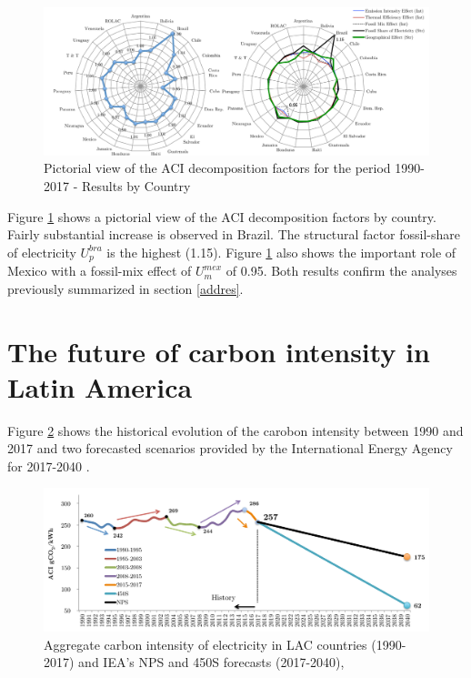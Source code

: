 \documentclass[energies,article,accept,moreauthors,12pt,a4paper]{mdpi} %
\begin{document}
 
         \begin{figure}[!ht] \centerline{
     \includegraphics[width=16cm]{images/main11.pdf}}
       \caption{Pictorial view of the ACI decomposition factors for the period 1990-2017 - Results by Country}
      \label{main5}
        \end{figure}

  Figure  \ref{main5} shows a pictorial view of the ACI decomposition factors by country.  Fairly substantial increase is observed in Brazil. The structural factor fossil-share of electricity  $U^{bra}_{p}$ is the highest (1.15). Figure \ref{main5} also shows the important role of Mexico with a fossil-mix effect of $U^{mex}_{m}$ of 0.95.  Both results confirm the  analyses previously  summarized in section \ref{addres}.
 
 \section{The future of carbon intensity in Latin America}  \label{policy}

 Figure \ref{ACI2}
shows the historical evolution of the carobon intensity between 1990 and 2017 and two forecasted scenarios provided by the International Energy Agency for 2017-2040 \citep{weio2014}.  

  \begin{figure}[ht] \centerline{
     \includegraphics[width=12cm]{images/LACACIf.pdf}}
       \caption{Aggregate carbon intensity of electricity in LAC countries (1990-2017) and IEA's NPS and 450S forecasts (2017-2040),  \citep{weio2014}}
      \label{ACI2}
        \end{figure}
\end{document}
